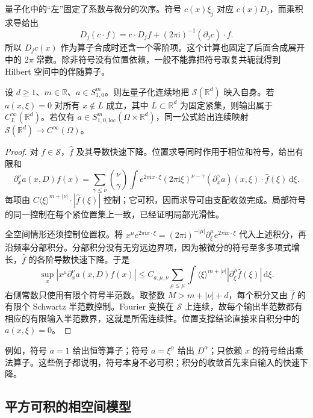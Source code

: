 \ProseParagraphBreak
量子化中的“左”固定了系数与微分的次序。符号 \(c(x)\xi_j\) 对应 \(c(x)D_j\)，而乘积求导给出
\[
 D_j(c\cdot f)=c\cdot D_jf+(2\pi\mathrm i)^{-1}(\partial_jc)\cdot f.
\]
所以 \(D_jc(x)\) 作为算子合成时还含一个零阶项。这个计算也固定了后面合成展开中的 \(2\pi\) 常数。除非符号没有位置依赖，一般不能靠把符号取复共轭就得到 Hilbert 空间中的伴随算子。

\begin{proposition}
\label{b2:prop:G-schwartz-action}
设 \(d\ge1\)、\(m\in\mathbb R\)、\(a\in S^m_{1,0}\)。则左量子化连续地把 \(\mathcal S(\mathbb R^d)\) 映入自身。若 \(a(x,\xi)=0\) 对所有 \(x\notin L\) 成立，其中 \(L\subset\mathbb R^d\) 为固定紧集，则输出属于 \(C_L^\infty(\mathbb R^d)\)。若仅有 \(a\in S^m_{1,0,\mathrm{loc}}(\Omega\times\mathbb R^d)\)，同一公式给出连续映射 \(\mathcal S(\mathbb R^d)\to C^\infty(\Omega)\)。
\end{proposition}
\begin{proof}
对 \(f\in\mathcal S\)，\(\widehat f\) 及其导数快速下降。位置求导同时作用于相位和符号，给出有限和
\[
 \partial_x^\nu a(x,D)f(x)
 =\sum_{\gamma\le\nu}\binom\nu\gamma
   \int e^{2\pi\mathrm ix\cdot\xi}(2\pi\mathrm i\xi)^{\nu-\gamma}
       (\partial_x^\gamma a)(x,\xi)\cdot\widehat f(\xi)\,\mathrm d\xi.
\]
每项由 \(C\langle\xi\rangle^{m+|\nu|}\cdot|\widehat f(\xi)|\) 控制；它可积，因而求导可由支配收敛完成。局部符号的同一控制在每个紧位置集上一致，已经证明局部光滑性。

全空间情形还须控制位置权。将
\(x^\mu e^{2\pi\mathrm ix\cdot\xi}
=(2\pi\mathrm i)^{-|\mu|}\partial_\xi^\mu e^{2\pi\mathrm ix\cdot\xi}\)
代入上述积分，再沿频率分部积分。分部积分没有无穷远边界项，因为被微分的符号至多多项式增长，\(\widehat f\) 的各阶导数快速下降。于是
\[
 \sup_x|x^\mu\partial_x^\nu a(x,D)f(x)|
 \le C_{a,\mu,\nu}\sum_{\rho\le\mu}
        \int\langle\xi\rangle^{m+|\nu|}
                  |\partial_\xi^\rho\widehat f(\xi)|\,\mathrm d\xi.
\]
右侧常数只使用有限个符号半范数。取整数 \(M>m+|\nu|+d\)，每个积分又由 \(\widehat f\) 的有限个 Schwartz 半范数控制。Fourier 变换在 \(\mathcal S\) 上连续，故每个输出半范数都有相应的有限输入半范数界，这就是所需连续性。位置支撑结论直接来自积分中的 \(a(x,\xi)=0\)。
\end{proof}
例如，符号 \(a=1\) 给出恒等算子；符号 \(a=\xi^\alpha\) 给出 \(D^\alpha\)；只依赖 \(x\) 的符号给出乘法算子。这些例子都说明，符号本身不必可积；积分的收敛首先来自输入的快速下降。

\subsection{平方可积的相空间模型}
\label{b2:subsec:G0102}

